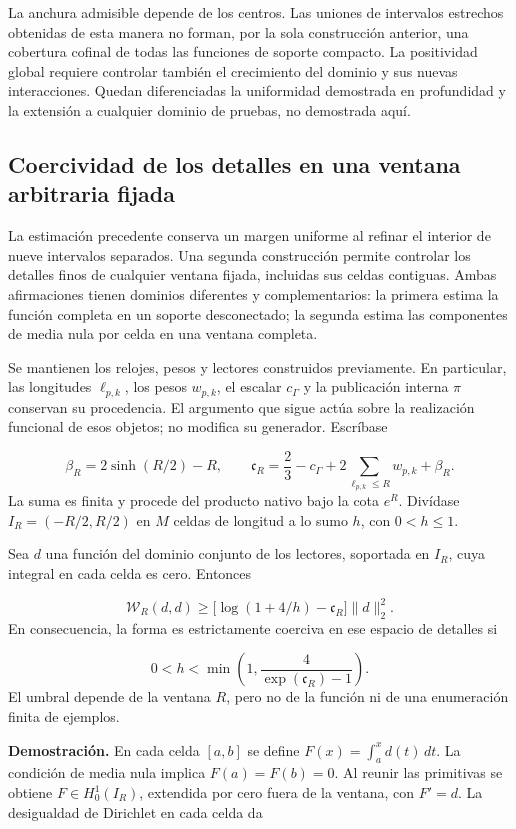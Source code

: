La anchura admisible depende de los centros. Las uniones de intervalos estrechos obtenidas de esta manera no forman, por la sola construcción anterior, una cobertura cofinal de todas las funciones de soporte compacto. La positividad global requiere controlar también el crecimiento del dominio y sus nuevas interacciones. Quedan diferenciadas la uniformidad demostrada en profundidad y la extensión a cualquier dominio de pruebas, no demostrada aquí.

\subsection{Coercividad de los detalles en una ventana arbitraria fijada}
\label{viii:rz:detalles}
La estimación precedente conserva un margen uniforme al refinar el interior de nueve intervalos separados. Una segunda construcción permite controlar los detalles finos de cualquier ventana fijada, incluidas sus celdas contiguas. Ambas afirmaciones tienen dominios diferentes y complementarios: la primera estima la función completa en un soporte desconectado; la segunda estima las componentes de media nula por celda en una ventana completa.

Se mantienen los relojes, pesos y lectores construidos previamente. En particular, las longitudes \(\ell_{p,k}\), los pesos \(w_{p,k}\), el escalar \(c_\Gamma\) y la publicación interna \(\pi\) conservan su procedencia. El argumento que sigue actúa sobre la realización funcional de esos objetos; no modifica su generador. Escríbase

\[
\beta_R=2\sinh(R/2)-R,\qquad
\mathfrak c_R=\frac23-c_\Gamma+
2\sum_{\ell_{p,k}\leq R}w_{p,k}+\beta_R.
\]
La suma es finita y procede del producto nativo bajo la cota \(e^R\). Divídase \(I_R=(-R/2,R/2)\) en \(M\) celdas de longitud a lo sumo \(h\), con \(0<h\leq1\).

Sea \(d\) una función del dominio conjunto de los lectores, soportada en \(I_R\), cuya integral en cada celda es cero. Entonces

\[
\boxed{\mathscr W_R(d,d)\geq
\bigl[\log(1+4/h)-\mathfrak c_R\bigr]\|d\|_2^2.}
\]
En consecuencia, la forma es estrictamente coerciva en ese espacio de detalles si

\[
0<h<\min\left(1,\frac4{\exp(\mathfrak c_R)-1}\right).
\]
El umbral depende de la ventana \(R\), pero no de la función ni de una enumeración finita de ejemplos.

\textbf{Demostración.} En cada celda \([a,b]\) se define \(F(x)=\int_a^x d(t)\,dt\). La condición de media nula implica \(F(a)=F(b)=0\). Al reunir las primitivas se obtiene \(F\in H_0^1(I_R)\), extendida por cero fuera de la ventana, con \(F'=d\). La desigualdad de Dirichlet en cada celda da

